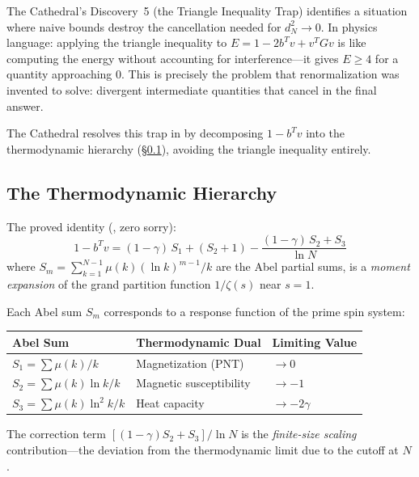 \documentclass[11pt,a4paper]{article}
\begin{document}
\begin{observation}
The Cathedral's Discovery~5 (the Triangle Inequality Trap) identifies
a situation where naive bounds destroy the cancellation needed for
$d_N^2 \to 0$. In physics language: applying the triangle inequality
to $E = 1 - 2b^Tv + v^TGv$ is like computing the energy without
accounting for interference---it gives $E \geq 4$ for a quantity
approaching $0$. This is precisely the problem that renormalization
was invented to solve: divergent intermediate quantities that cancel
in the final answer.

The Cathedral resolves this trap in  by
decomposing $1 - b^T v$ into the thermodynamic hierarchy (\S\ref{sec:thermo}),
avoiding the triangle inequality entirely.
\end{observation}

\subsection{The Thermodynamic Hierarchy}
\label{sec:thermo}

The proved identity (, zero sorry):
\[
  1 - b^T v
  = (1 - \gamma)\, S_1 + (S_2 + 1)
  - \frac{(1 - \gamma)\,S_2 + S_3}{\ln N}
\]
where $S_m = \sum_{k=1}^{N-1} \mu(k)(\ln k)^{m-1}/k$ are the Abel
partial sums, is a \emph{moment expansion} of the grand partition function
$1/\zeta(s)$ near $s = 1$.

\begin{correspondence}
  Each Abel sum $S_m$ corresponds to a response function of the prime
  spin system:
  \begin{center}
  \begin{tabular}{@{}lll@{}}
  \toprule
  \textbf{Abel Sum} & \textbf{Thermodynamic Dual} & \textbf{Limiting Value} \\
  \midrule
  $S_1 = \sum \mu(k)/k$ & Magnetization (PNT) & $\to 0$ \\
  $S_2 = \sum \mu(k)\ln k / k$ & Magnetic susceptibility & $\to -1$ \\
  $S_3 = \sum \mu(k)\ln^2 k / k$ & Heat capacity & $\to -2\gamma$ \\
  \bottomrule
  \end{tabular}
  \end{center}
  The correction term $[(1-\gamma)S_2 + S_3]/\ln N$ is the
  \emph{finite-size scaling} contribution---the deviation from the
  thermodynamic limit due to the cutoff at $N$.
\end{correspondence}
\end{document}
